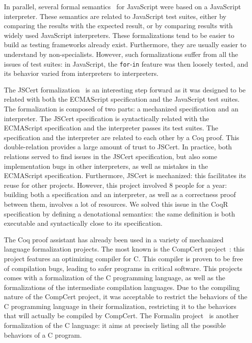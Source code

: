\documentclass[
    sigplan,
    10pt,
    review, %
    natbib=false %
 ]{acmart}
\begin{document}
In parallel, several formal semantics~\parencite{js-ml, Guha2010, Politz:S5, kjs}
for JavaScript were based on a JavaScript interpreter.
These semantics are related to JavaScript test suites,
either by comparing the results with the expected result,
or by comparing results with widely used JavaScript interpreters.
These formalizations tend to be easier to build
as testing frameworks already exist.
Furthermore, they are usually easier to understand by non-specialists.
However, such formalizations suffer from all the issues of test suites:
in JavaScript, the \texttt{for}-\texttt{in}
feature was then loosely tested,
and its behavior varied from interpreters to interpreters.

The JSCert formalization~\parencite{popl14jscert}
is an interesting step forward as it was designed
to be related with both the ECMAScript specification and the JavaScript test suites.
The formalization is composed of two parts:
a mechanized specification and an interpreter.
The JSCert specification is syntactically related with the ECMAScript specification
and the interpreter passes its test suites.
The specification and the interpreter are related to each other by a Coq proof.
This double-relation provides a large amount of trust to JSCert.
In practice, both relations served to find issues in the JSCert specification,
but also some implementation bugs in other interpreters,
as well as mistakes in the ECMAScript specification.
Furthermore, JSCert is mechanized:
this facilitates its reuse for other projects.
However, this project involved 8 people for a year:
building both a specification and an interpreter,
as well as a correctness proof between them, involves a lot of resources.
We solved this issue in the CoqR specification
by defining a denotational semantics:
the same definition is both executable and syntactically close to its specification.

The Coq proof assistant has already been used
in a variety of mechanized language formalization projects.
The most known is the CompCert project~\cite{Leroy-Compcert-CACM}:
this project features an optimizing compiler for C.
This compiler is proven to be free of compilation bugs,
leading to safer programs in critical software.
This projects comes with a formalization of the C programming language,
as well as the formalizations of the intermediate compilation languages.
%
Due to the compiling nature of the CompCert project,
it was acceptable to restrict the behaviors of the C programming language
in their formalization,
restricting it to the behaviors that will actually be compiled by CompCert.
The Formalin project~\parencite{formalin} is another formalization
of the C language:
it aims at precisely listing all the possible behaviors of a C program.
\end{document}
